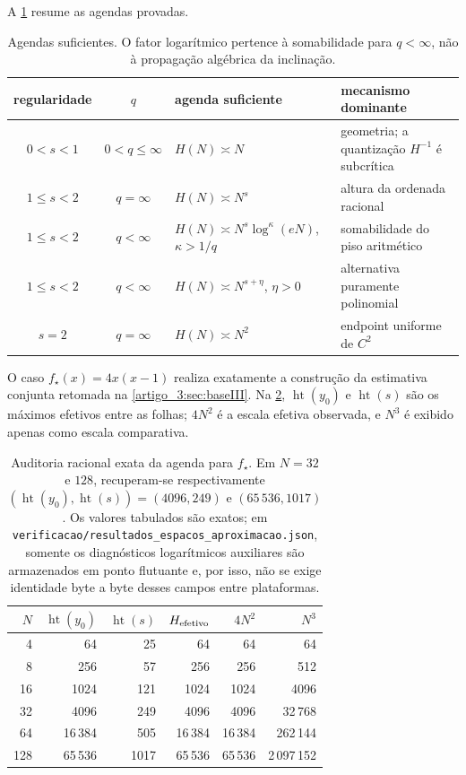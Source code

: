\documentclass[12pt,a4paper]{article}
\theoremstyle{preciso}
\theoremstyle{definition}
\newcommand{\height}{\operatorname{ht}}
\theoremstyle{preciso}
\theoremstyle{preciso}
\theoremstyle{preciso}
\theoremstyle{preciso}
\theoremstyle{definition}
\theoremstyle{preciso}
\theoremstyle{definition}
\theoremstyle{preciso}
\theoremstyle{preciso}
\theoremstyle{definition}
\begin{document}
A \cref{artigo_3:tab:height-schedules} resume as agendas provadas.
\begin{table}[t]
 \centering
\caption{Agendas suficientes. O fator logarítmico pertence à
 somabilidade para $q<\infty$, não à propagação algébrica da inclinação.}\label{artigo_3:tab:height-schedules}
\small
 \begin{tabularx}{\linewidth}{@{}cclX@{}}
\toprule
regularidade & $q$ & agenda suficiente & mecanismo dominante\\
\midrule
$0<s<1$ & $0<q\le\infty$ & $H(N)\asymp N$ & geometria; a quantização $H^{-1}$ é subcrítica\\
$1\le s<2$ & $q=\infty$ & $H(N)\asymp N^s$ & altura da ordenada racional\\
$1\le s<2$ & $q<\infty$ & $H(N)\asymp N^s\log^\kappa(eN)$, $\kappa>1/q$ & somabilidade do piso aritmético\\
$1\le s<2$ & $q<\infty$ & $H(N)\asymp N^{s+\eta}$, $\eta>0$ & alternativa puramente polinomial\\
$s=2$ & $q=\infty$ & $H(N)\asymp N^2$ & endpoint uniforme de $C^2$\\
\bottomrule
\end{tabularx}
\end{table}

O caso $f_\star(x)=4x(x-1)$ realiza exatamente a construção da
estimativa conjunta retomada na \cref{artigo_3:sec:baseIII}.
Na \cref{artigo_3:tab:height-audit}, $\height(y_0)$ e $\height(s)$ são os
máximos efetivos entre as folhas; $4N^2$ é a escala efetiva observada, e
$N^3$ é exibido apenas como escala comparativa.
\begin{table}[t]
 \centering
\caption{Auditoria racional exata da agenda para $f_\star$. Em $N=32$ e
 $128$, recuperam-se respectivamente
 $(\height(y_0),\height(s))=(4096,249)$ e $(65\,536,1017)$. Os valores
 tabulados são exatos; em
 \texttt{verificacao/resultados\_espacos\_aproximacao.json}, somente os diagnósticos
 logarítmicos auxiliares são armazenados em ponto flutuante e, por isso, não
 se exige identidade byte a byte desses campos entre plataformas.}\label{artigo_3:tab:height-audit}
\small
 \begin{tabular}{rrrrrr}
\toprule
$N$ & $\height(y_0)$ & $\height(s)$ & $H_{\rm efetivo}$ & $4N^2$ & $N^3$\\
\midrule
4 & 64 & 25 & 64 & 64 & 64\\
8 & 256 & 57 & 256 & 256 & 512\\
16 & 1024 & 121 & 1024 & 1024 & 4096\\
32 & 4096 & 249 & 4096 & 4096 & 32\,768\\
64 & 16\,384 & 505 & 16\,384 & 16\,384 & 262\,144\\
128 & 65\,536 & 1017 & 65\,536 & 65\,536 & 2\,097\,152\\
\bottomrule
\end{tabular}
\end{table}
\end{document}
